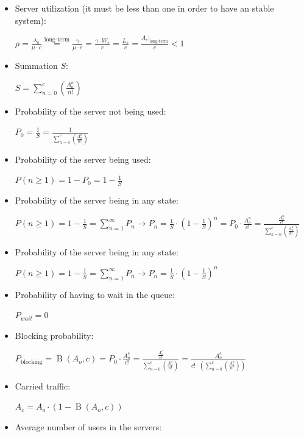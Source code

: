 \documentclass[../main.tex]{subfiles}
\begin{document}
\begin{itemize}
	\item {
		Server utilization (it must be less than one in order to have an stable system):

		$
			\rho =
			\frac {\lambda_a} {\mu \cdot c} \overset {\textrm{long-term}} {=}
			\frac {\gamma} {\mu \cdot c} =
			\frac {\gamma \cdot W_s} {c} =
			\frac {L_s} {c} =
			\frac {\left. A_c \right|_{\textrm{long-term}}} {c}
			< 1
		$
	}
	\item {
		Summation $S$:

		$
			S = \sum_{n=0}^{c} \left( \frac {A_{o}^n} {n!} \right)
		$
	}
	\item {
		Probability of the server not being used:

		$
			P_0 = \frac {1} {S} = \frac {1} {\sum_{n=0}^{c} \left( \frac {A_{o}^n} {n!} \right)}
		$
	}
	\item {
		Probability of the server being used:

		$
			P(n \geq 1) = 1 - P_0 = 1 - \frac {1} {S}
		$
	}
	\item {
		Probability of the server being in any state:

		$
			P(n \geq 1) = 1 - \frac {1} {S} = \sum_{n=1}^{\infty} P_n \rightarrow
			P_n = \frac {1} {S} \cdot \left( 1 - \frac {1} {S} \right)^n =
			P_0 \cdot \frac {A_{o}^n} {c!} = \frac {\frac{A_{o}^n}{c!}} {\sum_{k=0}^c \left( \frac {A_{o}^k} {k!} \right)}
		$
	}
	\item {
		Probability of the server being in any state:

		$
			P(n \geq 1) = 1 - \frac {1} {S} = \sum_{n=1}^{\infty} P_n \rightarrow
			P_n = \frac {1} {S} \cdot \left( 1 - \frac {1} {S} \right)^n
		$
	}
	\item {
		Probability of having to wait in the queue:

		$
			P_{wait} = 0
		$
	}
	\item {
		Blocking probability:

		$
			P_{\textrm{blocking}} = \operatorname{B}(A_o, c) = P_0 \cdot \frac {A_{o}^c} {c!} = \frac {\frac{A_{o}^c}{c!}} {\sum_{n=0}^c \left( \frac {A_{o}^n} {n!} \right)} = \frac {A_{o}^c} { c! \cdot \left( \sum_{n=0}^{c} \left( \frac {A_{o}^n} {n!} \right) \right) }
		$
	}
	\item {
		Carried traffic:

		$
			A_c = A_o \cdot \left( 1 - \operatorname{B}(A_o, c) \right)
		$
	}
	\item {
		Average number of users in the servers:

}
\end{itemize}
\end{document}
